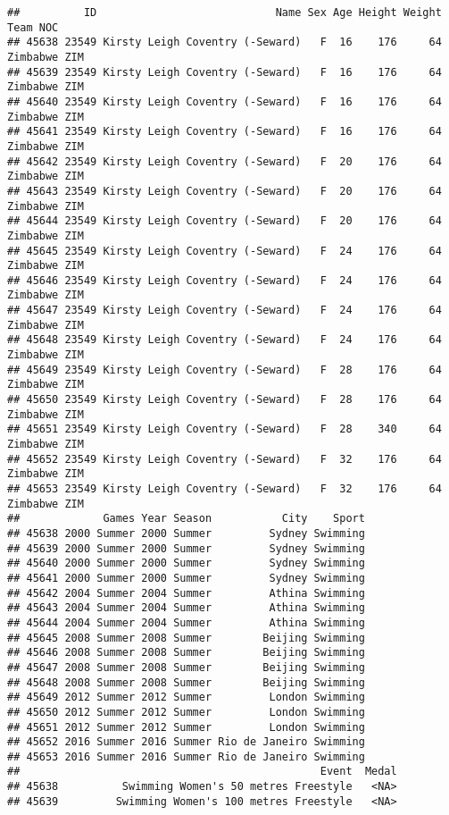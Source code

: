 \documentclass[
]{article}
\begin{document}
\begin{verbatim}
##          ID                            Name Sex Age Height Weight     Team NOC
## 45638 23549 Kirsty Leigh Coventry (-Seward)   F  16    176     64 Zimbabwe ZIM
## 45639 23549 Kirsty Leigh Coventry (-Seward)   F  16    176     64 Zimbabwe ZIM
## 45640 23549 Kirsty Leigh Coventry (-Seward)   F  16    176     64 Zimbabwe ZIM
## 45641 23549 Kirsty Leigh Coventry (-Seward)   F  16    176     64 Zimbabwe ZIM
## 45642 23549 Kirsty Leigh Coventry (-Seward)   F  20    176     64 Zimbabwe ZIM
## 45643 23549 Kirsty Leigh Coventry (-Seward)   F  20    176     64 Zimbabwe ZIM
## 45644 23549 Kirsty Leigh Coventry (-Seward)   F  20    176     64 Zimbabwe ZIM
## 45645 23549 Kirsty Leigh Coventry (-Seward)   F  24    176     64 Zimbabwe ZIM
## 45646 23549 Kirsty Leigh Coventry (-Seward)   F  24    176     64 Zimbabwe ZIM
## 45647 23549 Kirsty Leigh Coventry (-Seward)   F  24    176     64 Zimbabwe ZIM
## 45648 23549 Kirsty Leigh Coventry (-Seward)   F  24    176     64 Zimbabwe ZIM
## 45649 23549 Kirsty Leigh Coventry (-Seward)   F  28    176     64 Zimbabwe ZIM
## 45650 23549 Kirsty Leigh Coventry (-Seward)   F  28    176     64 Zimbabwe ZIM
## 45651 23549 Kirsty Leigh Coventry (-Seward)   F  28    340     64 Zimbabwe ZIM
## 45652 23549 Kirsty Leigh Coventry (-Seward)   F  32    176     64 Zimbabwe ZIM
## 45653 23549 Kirsty Leigh Coventry (-Seward)   F  32    176     64 Zimbabwe ZIM
##             Games Year Season           City    Sport
## 45638 2000 Summer 2000 Summer         Sydney Swimming
## 45639 2000 Summer 2000 Summer         Sydney Swimming
## 45640 2000 Summer 2000 Summer         Sydney Swimming
## 45641 2000 Summer 2000 Summer         Sydney Swimming
## 45642 2004 Summer 2004 Summer         Athina Swimming
## 45643 2004 Summer 2004 Summer         Athina Swimming
## 45644 2004 Summer 2004 Summer         Athina Swimming
## 45645 2008 Summer 2008 Summer        Beijing Swimming
## 45646 2008 Summer 2008 Summer        Beijing Swimming
## 45647 2008 Summer 2008 Summer        Beijing Swimming
## 45648 2008 Summer 2008 Summer        Beijing Swimming
## 45649 2012 Summer 2012 Summer         London Swimming
## 45650 2012 Summer 2012 Summer         London Swimming
## 45651 2012 Summer 2012 Summer         London Swimming
## 45652 2016 Summer 2016 Summer Rio de Janeiro Swimming
## 45653 2016 Summer 2016 Summer Rio de Janeiro Swimming
##                                               Event  Medal
## 45638          Swimming Women's 50 metres Freestyle   <NA>
## 45639         Swimming Women's 100 metres Freestyle   <NA>

\end{verbatim}
\end{document}
